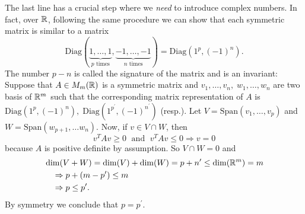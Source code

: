 The last line has a crucial step where we \textit{need} to introduce complex numbers. In fact, over $\mathbb{R}$, following the same procedure 
we can show that each symmetric matrix is similar to a matrix 
\begin{equation}
    \text{Diag}(\underset{p\text{ times}}{\underbrace{1,\dots,1}},\underset{n\text{ times}}{\underbrace{-1,\dots,-1}})
    =\text{Diag}(1^p,(-1)^n).
\end{equation}
The number $p-n$ is called the signature of the matrix and is an invariant: Suppose that $A\in M_m(\mathbb{R})$ is a symmetric 
matrix and $v_1,\dots, v_n,\; w_1,\dots, w_n$ are two basis of $\mathbb{R}^m$ such that the corresponding 
matrix representation of $A$ is $\text{Diag}(1^p,(-1)^n),\; \text{Diag}(1^{p^\prime},(-1)^{n^\prime})$ (resp.). Let 
$V=\text{Span}(v_1,\dots, v_p)$ and $W=\text{Span}(w_{p+1},\dots w_{n})$. Now, if $v\in V\cap W$, then 
\begin{equation}
    v^TAv \geq 0 \;\text{ and }\; v^TAv\leq0\Rightarrow v =0
\end{equation}
because $A$ is positive definite by assumption. So $V\cap W =0 $ and 
\begin{equation}
    \begin{split}
         &\dim(V+W)=\dim(V)+\dim(W)=p+n^\prime\leq\dim(\mathbb{R}^m)=m\\
         &\quad\Rightarrow p+(m-p^\prime)\leq m\\
         &\quad\Rightarrow p\leq p^\prime.
    \end{split}
\end{equation}  
By symmetry we conclude that $p=p^\prime$.\par 

